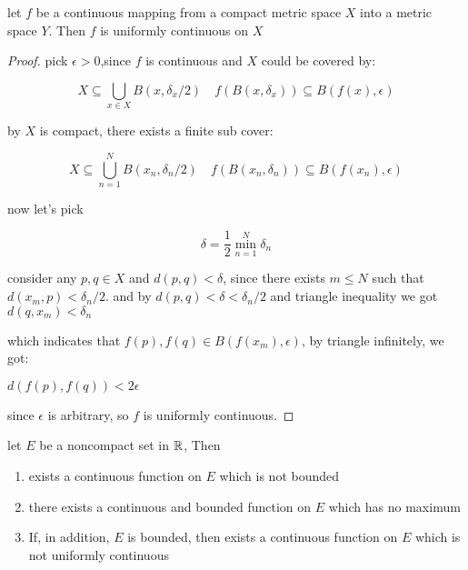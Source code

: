 \begin{thm}
    let $f$ be a continuous mapping from a compact metric space $X$ into a metric space $Y$.
    Then $f$ is uniformly continuous on $X$
\end{thm}

\begin{proof}
    pick $\epsilon > 0$,since $f$ is continuous and $X$ could be covered by:

    \[
        X \subseteq \bigcup_{x \in X}B(x, \delta_x/2) \quad f(B(x, \delta_x)) \subseteq B(f(x), \epsilon)
    \]

    by $X$ is compact, there exists a finite sub cover:

    \[
        X \subseteq \bigcup_{n=1}^{N}B(x_n, \delta_n/2) \quad f(B(x_n, \delta_n)) \subseteq B(f(x_n), \epsilon)
    \]

    now let's pick 

    \[
        \delta = \frac{1}{2}\min_{n=1}^{N} \delta_n
    \]

    consider any $p,q \in X$ and $d(p,q) < \delta$, since there exists $m \le N$ such that $d(x_m, p) < \delta_n / 2$.
    and by $d(p,q) < \delta < \delta_n / 2$ and triangle inequality we got $d(q, x_m) < \delta_n$ 

    which indicates that $f(p), f(q) \in B(f(x_m), \epsilon)$, by triangle infinitely, we got:

    $d(f(p), f(q)) < 2\epsilon$

    since $\epsilon$ is arbitrary, so $f$ is uniformly continuous.
\end{proof}

\begin{thm}
    let $E$ be a noncompact set in $\mathbb{R}$, Then

    \begin{enumerate}
        \item exists a continuous function on $E$ which is not bounded

        \item there exists a continuous and bounded function on $E$ which has no maximum



        \item  If, in addition, $E$ is bounded, then exists a continuous function on $E$ which is not uniformly continuous
    \end{enumerate}

    
\end{thm}

